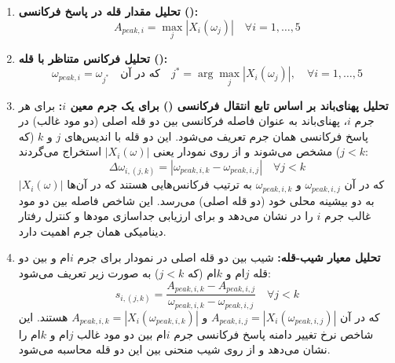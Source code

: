 \begin{enumerate}
    \item \textbf{تحلیل مقدار قله در پاسخ فرکانسی ():}
    \begin{equation}\label{Eq.peak_amplitude_analysis_detailed}
    A_{peak,i} = \max_{j} |X_i(\omega_j)| \quad \forall i = 1,\ldots,5
    \end{equation}

    \item \textbf{تحلیل فرکانس متناظر با قله ():}
    \begin{equation}\label{Eq.peak_frequency_analysis_detailed}
    \omega_{peak,i} = \omega_{j^*} \quad \text{که در آن} \quad j^* = \arg\max_{j} |X_i(\omega_j)|, \quad \forall i = 1,\ldots,5
    \end{equation}

    \item \textbf{تحلیل پهنای‌باند بر اساس تابع انتقال فرکانسی () برای یک جرم معین $i$:}
    برای هر جرم $i$، پهنای‌باند به عنوان فاصله فرکانسی بین دو قله اصلی (دو مود غالب) در پاسخ فرکانسی همان جرم تعریف می‌شود. این دو قله با اندیس‌های $j$ و $k$ (که $j < k$) مشخص می‌شوند و از روی نمودار  یعنی $|X_i(\omega)|$ استخراج می‌گردند:
    \begin{equation}\label{Eq.bandwidth_analysis_detailed}
    \Delta\omega_{i,(j,k)} = |\omega_{peak,i,k} - \omega_{peak,i,j}| \quad \forall j < k
    \end{equation}
    که در آن $\omega_{peak,i,j}$ و $\omega_{peak,i,k}$ به ترتیب فرکانس‌هایی هستند که در آن‌ها $|X_i(\omega)|$ به دو بیشینه محلی خود (دو قله اصلی) می‌رسد. این شاخص فاصله بین دو مود غالب جرم $i$ را در  نشان می‌دهد و برای ارزیابی جداسازی مودها و کنترل رفتار دینامیکی همان جرم اهمیت دارد.

    \item \textbf{تحلیل معیار شیب-قله:}
    شیب بین دو قله اصلی در نمودار  برای جرم $i$ام و بین دو قله $j$ام و $k$ام (که $j < k$) به صورت زیر تعریف می‌شود:
    \begin{equation}\label{Eq.slope_analysis_detailed}
    s_{i,(j,k)} = \frac{A_{peak,i,k} - A_{peak,i,j}}{\omega_{peak,i,k} - \omega_{peak,i,j}} \quad \forall j < k
    \end{equation}
    که در آن $A_{peak,i,j} = |X_i(\omega_{peak,i,j})|$ و $A_{peak,i,k} = |X_i(\omega_{peak,i,k})|$ هستند. این شاخص نرخ تغییر دامنه پاسخ فرکانسی جرم $i$ام بین دو مود غالب $j$ام و $k$ام را نشان می‌دهد و از روی شیب منحنی  بین این دو قله محاسبه می‌شود. 


\end{enumerate}
